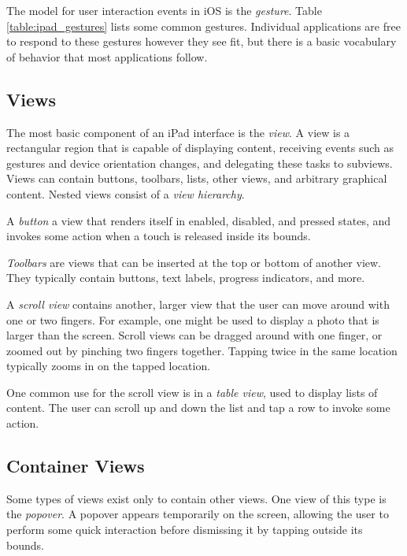 The model for user interaction events in iOS is the \emph{gesture}. Table
\ref{table:ipad_gestures} lists some common gestures. Individual applications
are free to respond to these gestures however they see fit, but there is a basic
vocabulary of behavior that most applications follow.

\subsection{Views}
\label{sect:ipad_views}

The most basic component of an iPad interface is the \emph{view}. A view is a
rectangular region that is capable of displaying content, receiving events such
as gestures and device orientation changes, and delegating these tasks to
subviews. Views can contain buttons, toolbars, lists, other views, and arbitrary
graphical content. Nested views consist of a \emph{view hierarchy}.

A \emph{button} a view that renders itself in enabled, disabled, and pressed
states, and invokes some action when a touch is released inside its bounds.

\emph{Toolbars} are views that can be inserted at the top or bottom of another
view. They typically contain buttons, text labels, progress indicators, and
more.

A \emph{scroll view} contains another, larger view that the user can move
around with one or two fingers. For example, one might be used to display a
photo that is larger than the screen. Scroll views can be dragged around with
one finger, or zoomed out by pinching two fingers together. Tapping twice in the
same location typically zooms in on the tapped location.

One common use for the scroll view is in a \emph{table view}, used to display
lists of content. The user can scroll up and down the list and tap a row to
invoke some action.

\subsection{Container Views}
\label{sect:ipad_container_views}

Some types of views exist only to contain other views. One view of this type is
the \emph{popover}. A popover appears temporarily on the screen, allowing the
user to perform some quick interaction before dismissing it by tapping outside
its bounds.

